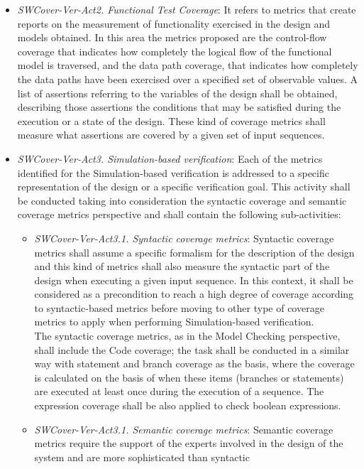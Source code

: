 \begin{itemize}
\begin{itemize}
\end{itemize}
\item {\it SWCover-Ver-Act2. Functional Test Coverage}: It refers to
  metrics that create reports on the measurement of functionality
  exercised in the design and models obtained. In this area the
  metrics proposed are the control-flow coverage that indicates how
  completely the logical flow of the functional model is traversed,
  and the data path coverage, that indicates how completely the data
  paths have been exercised over a specified set of observable
  values. A list of assertions referring to the variables of the
  design shall be obtained, describing those assertions the conditions
  that may be satisfied during the execution or a state of the
  design. These kind of coverage metrics shall measure what assertions
  are covered by a given set of input sequences.
\item {\it SWCover-Ver-Act3. Simulation-based verification}: Each of
  the metrics identified for the Simulation-based verification is
  addressed to a specific representation of the design or a specific
  verification goal. This activity shall be conducted taking into
  consideration the syntactic coverage and semantic coverage metrics
  perspective and shall contain the following sub-activities:
\begin{itemize}
\item {\it SWCover-Ver-Act3.1. Syntactic coverage metrics}: Syntactic
  coverage metrics shall assume a specific formalism for the
  description of the design and this kind of metrics shall also
  measure the syntactic part of the design when executing a given
  input sequence. In this context, it shall be considered as a
  precondition to reach a high degree of coverage according to
  syntactic-based metrics before moving to other type of coverage
  metrics to apply when performing Simulation-based
  verification. \\The syntactic coverage metrics, as in the Model
  Checking perspective, shall include the Code coverage; the task
  shall be conducted in a similar way with statement and branch
  coverage as the basis, where the coverage is calculated on the basis
  of when these items (branches or statements) are executed at least
  once during the execution of a sequence. The expression coverage
  shall be also applied to check boolean expressions.
\item {\it SWCover-Ver-Act3.1. Semantic coverage metrics}: Semantic
  coverage metrics require the support of the experts involved in the
  design of the system and are more sophisticated than syntactic

\end{itemize}
\end{itemize}
